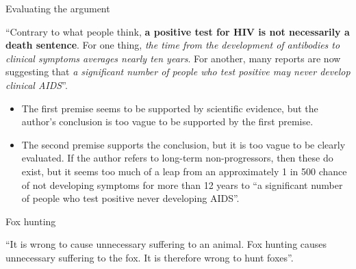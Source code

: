 \documentclass{beamer}
\begin{document}


\begin{frame}{Evaluating the argument}

	``Contrary to what people think, \textbf{a positive test for HIV is not necessarily a death sentence}. For one thing, \emph{the time from the development of antibodies to clinical symptoms averages nearly ten years}. For another, many reports are now suggesting that \emph{a significant number of people who test positive may never develop clinical AIDS}''.
	

\begin{itemize}
\item The first premise seems to be supported by scientific evidence, but the author's conclusion is too vague to be supported by the first premise.
\item The second premise supports the conclusion, but it is too vague to be clearly evaluated. If the author refers to long-term non-progressors, then these do exist, but it seems too much of a leap from an approximately 1 in 500 chance of not developing symptoms for more than 12 years to ``a significant number of people who test positive never developing AIDS''. 
\end{itemize}
\end{frame}




\begin{frame}{Fox hunting}

``It is wrong to cause unnecessary suffering to an animal. Fox hunting causes unnecessary suffering to the fox. It is therefore wrong to hunt foxes''.

\end{frame}

\end{document}
